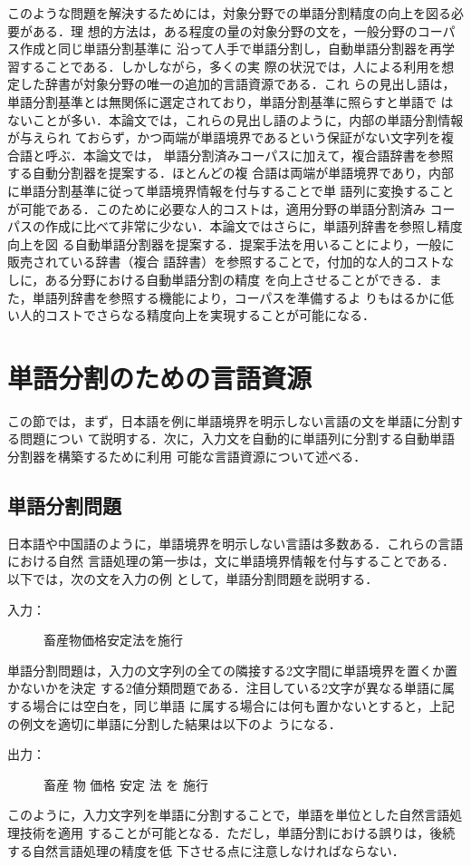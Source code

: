 \documentclass[japanese]{jnlp_JS2.0}
\begin{document}
このような問題を解決するためには，対象分野での単語分割精度の向上を図る必要がある．理
想的方法は，ある程度の量の対象分野の文を，一般分野のコーパス作成と同じ単語分割基準に
沿って人手で単語分割し，自動単語分割器を再学習することである．しかしながら，多くの実
際の状況では，人による利用を想定した辞書が対象分野の唯一の追加的言語資源である．これ
らの見出し語は，単語分割基準とは無関係に選定されており，単語分割基準に照らすと単語で
はないことが多い．本論文では，これらの見出し語のように，内部の単語分割情報が与えられ
ておらず，かつ両端が単語境界であるという保証がない文字列を複合語と呼ぶ．本論文では，
単語分割済みコーパスに加えて，複合語辞書を参照する自動分割器を提案する．ほとんどの複
合語は両端が単語境界であり，内部に単語分割基準に従って単語境界情報を付与することで単
語列に変換することが可能である．このために必要な人的コストは，適用分野の単語分割済み
コーパスの作成に比べて非常に少ない．本論文ではさらに，単語列辞書を参照し精度向上を図
る自動単語分割器を提案する．提案手法を用いることにより，一般に販売されている辞書（複合
語辞書）を参照することで，付加的な人的コストなしに，ある分野における自動単語分割の精度
を向上させることができる．また，単語列辞書を参照する機能により，コーパスを準備するよ
りもはるかに低い人的コストでさらなる精度向上を実現することが可能になる．

\section{単語分割のための言語資源}
\label{section:LRS}

この節では，まず，日本語を例に単語境界を明示しない言語の文を単語に分割する問題につい
て説明する．次に，入力文を自動的に単語列に分割する自動単語分割器を構築するために利用
可能な言語資源について述べる．


\subsection{単語分割問題}


日本語や中国語のように，単語境界を明示しない言語は多数ある．これらの言語における自然
言語処理の第一歩は，文に単語境界情報を付与することである．以下では，次の文を入力の例
として，単語分割問題を説明する．
\begin{description}
\item[入力：] 畜産物価格安定法を施行
\end{description}
単語分割問題は，入力の文字列の全ての隣接する2文字間に単語境界を置くか置かないかを決定
する2値分類問題である．注目している2文字が異なる単語に属する場合には空白を，同じ単語
に属する場合には何も置かないとすると，上記の例文を適切に単語に分割した結果は以下のよ
うになる．
\begin{description}
\item[出力：] 畜産 物 価格 安定 法 を 施行
\end{description}
このように，入力文字列を単語に分割することで，単語を単位とした自然言語処理技術を適用
することが可能となる．ただし，単語分割における誤りは，後続する自然言語処理の精度を低
下させる点に注意しなければならない．
\end{document}
